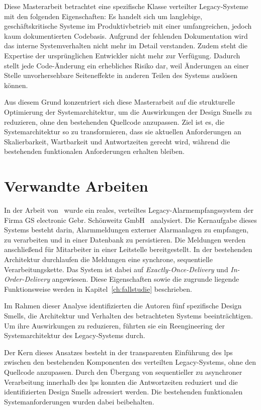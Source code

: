 Diese Masterarbeit betrachtet eine spezifische Klasse verteilter Legacy-Sys\-te\-me mit den folgenden Eigenschaften: Es handelt sich um langlebige, geschäfts\-kritische Systeme im Produktivbetrieb mit einer umfangreichen, jedoch kaum dokumentierten Codebasis. Aufgrund der fehlenden Dokumentation wird das interne Systemverhalten nicht mehr im Detail verstanden. Zudem steht die Expertise der ursprünglichen Entwickler nicht mehr zur Verfügung. Dadurch stellt jede Code-Änderung ein erhebliches Risiko dar, weil Änderungen an einer Stelle unvorhersehbare Seiteneffekte in anderen Teilen des Systems auslösen können.

Aus diesem Grund konzentriert sich diese Masterarbeit auf die strukturelle Optimierung der Systemarchitektur, um die Auswirkungen der Design Smells zu reduzieren, ohne den bestehenden Quellcode anzupassen. Ziel ist es, die Systemarchitektur so zu transformieren, dass sie aktuellen Anforderungen an Skalierbarkeit, Wartbarkeit und Antwortzeiten gerecht wird, während die bestehenden funktionalen Anforderungen erhalten bleiben.

\section{Verwandte Arbeiten}
\label{sec:related_work}

In der Arbeit von~\citep{liebig_2025_architectural_refactoring} wurde ein reales, verteiltes Legacy-Alarmempfangssystem der Firma GS electronic Gebr. Schönweitz GmbH~\citep{gselectronic} analysiert. Die Kernaufgabe dieses Systems besteht darin, Alarmmeldungen externer Alarmanlagen zu empfangen, zu verarbeiten und in einer Datenbank zu persistieren. Die Meldungen werden anschließend für Mitarbeiter in einer Leitstelle bereitgestellt. In der bestehenden Architektur durchlaufen die Meldungen eine synchrone, sequentielle Verarbeitungskette. Das System ist dabei auf \textit{Exactly-Once-Delivery} und \textit{In-Order-Delivery} angewiesen. Diese Eigenschaften sowie die zugrunde liegende Funktionsweise werden in Kapitel~\ref{ch:fallstudie} beschrieben.

Im Rahmen dieser Analyse identifizierten die Autoren fünf spezifische Design Smells, die Architektur und Verhalten des betrachteten Systems beeinträchtigen. Um ihre Auswirkungen zu reduzieren, führten sie ein Reengineering der Systemarchitektur des Legacy-Systems durch.

Der Kern dieses Ansatzes besteht in der transparenten Einführung des \gls{lps} zwischen den bestehenden Komponenten des verteilten Legacy-Systems, ohne den Quellcode anzupassen. Durch den Übergang von sequentieller zu asynchroner Verarbeitung innerhalb des \gls{lps} konnten die Antwortzeiten reduziert und die identifizierten Design Smells adressiert werden. Die bestehenden funktionalen Systemanforderungen wurden dabei beibehalten.

